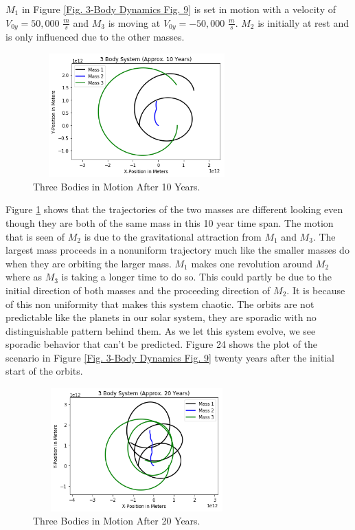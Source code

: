 \documentclass[twocolumn]{article}
\begin{document}
\par \noindent
$M_1$ in Figure \ref{Fig. 3-Body Dynamics Fig. 9} is set in motion with a velocity of $V_{0y}=50,000$ $\frac{m}{s}$ and $M_3$ is moving at $V_{0y}=-50,000$ $\frac{m}{s}$. $M_2$ is initially at rest and is only influenced due to the other masses. 
\begin{figure}[ht]
    \centering
    \includegraphics[width=8cm, height=4.75cm]{Figures/3-Body Dynamics (10).png}
    \caption{\small{Three Bodies in Motion After 10 Years.}}
    \label{Fig. 3-Body Dynamics Fig. 10}
\end{figure}
\par \indent
Figure \ref{Fig. 3-Body Dynamics Fig. 10} shows that the trajectories of the two masses are different looking even though they are both of the same mass in this 10 year time span. The motion that is seen of $M_2$ is due to the gravitational attraction from $M_1$ and $M_3$. The largest mass proceeds in a nonuniform trajectory much like the smaller masses do when they are orbiting the larger mass. $M_1$ makes one revolution around $M_2$ where as $M_3$ is taking a longer time to do so. This could partly be due to the initial direction of both masses and the proceeding direction of $M_2$. It is because of this non uniformity that makes this system chaotic. The orbits are not predictable like the planets in our solar system, they are sporadic with no distinguishable pattern behind them. As we let this system evolve, we see sporadic behavior that can't be predicted. Figure 24 shows the plot of the scenario in Figure \ref{Fig. 3-Body Dynamics Fig. 9} twenty years after the initial start of the orbits.
\begin{figure}[ht]
    \centering
    \includegraphics[width=8cm, height=4.75cm]{Figures/3-Body Dynamics (11).png}
    \caption{\small{Three Bodies in Motion After 20 Years.}}
    \label{Fig. 3 Body Dynamics}
\end{figure}
\end{document}
